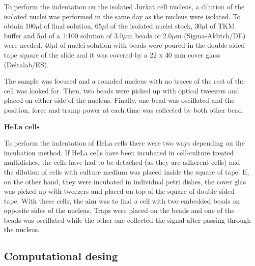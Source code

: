 \documentclass[12pt, a4paper]{article} %
\begin{document}
To perform the indentation on the isolated Jurkat cell nucleus, a dilution of the isolated nuclei was performed in the same day as the nucleus were isolated. To obtain 100$\mu$l of final solution, 65$\mu$l of the isolated nuclei stock, 30$\mu$l of TKM buffer and 5$\mu$l of a 1:100 solution of 3.0$\mu$m beads or 2.0$\mu$m (Sigma-Aldrich/DE) were needed. 40$\mu$l of nuclei solution with beads were poured in the double-sided tape square of the slide and it was covered by a 22 x 40 mm cover glass (Deltalab/ES).

\setlength{\parindent}{8pt}

The sample was focused and a rounded nucleus with no traces of the rest of the cell was looked for. Then, two beads were picked up with optical tweezers and placed on either side of the nucleus. Finally, one bead was oscillated and the position, force and tramp power at each time was collected by both other bead.

\setlength{\parindent}{0pt}

{\textbf{HeLa cells}}

To perform the indentation of HeLa cells there were two ways depending on the incubation method. If HeLa cells have been incubated in cell-culture treated multidishes, the cells have had to be detached (as they are adherent cells) and the dilution of cells with culture medium was placed inside the square of tape. If, on the other hand, they were incubated in individual petri dishes, the cover glas was picked up with tweezers and placed on top of the square of double-sided tape. With these cells, the aim was to find a cell with two embedded beads on opposite sides of the nucleus. Traps were placed on the beads and one of the beads was oscillated while the other one collected the signal after passing through the nucleus.

\setlength{\parindent}{8pt}

\setlength{\parskip}{0mm}

\subsection{Computational desing}

\end{document}
